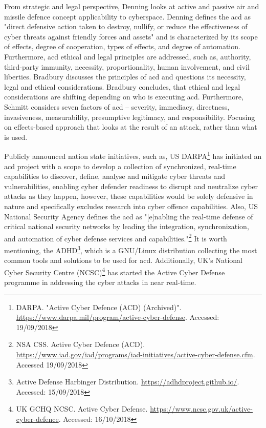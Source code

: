 From strategic and legal perspective, Denning \cite{Denning2014} looks at active and passive air and missile defence concept applicability to cyberspace. Denning defines the \gls{acd} as "direct defensive action taken to destroy, nullify, or reduce the effectiveness of cyber threats against friendly forces and assets" \cite{Denning2014} and is characterized by its scope of effects, degree of cooperation, types of effects, and degree of automation. Furthermore, \gls{acd} ethical and legal principles are addressed, such as, authority, third-party immunity, necessity, proportionality, human involvement, and civil liberties.
Bradbury \cite{Bradbury2013} discusses the principles of \gls{acd} and questions its necessity, legal and ethical considerations. Bradbury concludes, that ethical and legal considerations are shifting depending on who is executing \gls{acd}.
Furthermore, Schmitt \cite{Schmitt2002} considers seven factors of \gls{acd} -- severity, immediacy, directness, invasiveness, measurability, presumptive legitimacy, and responsibility. Focusing on effects-based approach that looks at the result of an attack, rather than what is used.

Publicly announced nation state initiatives, such as, US DARPA\footnote{\label{fnote:darpa}DARPA. "Active Cyber Defence (ACD) (Archived)". \url{https://www.darpa.mil/program/active-cyber-defense}. Accessed: 19/09/2018} has initiated an \gls{acd} project with a scope to develop a collection of synchronized, real-time capabilities to discover, define, analyse and mitigate cyber threats and vulnerabilities, enabling cyber defender readiness to disrupt and neutralize cyber attacks as they happen, however, these capabilities would be solely defensive in nature and specifically excludes research into cyber offence capabilities.
Also, US National Security Agency defines the \gls{acd} as "[e]nabling the real-time defense of critical national security networks by leading the integration, synchronization, and automation of cyber defense services and capabilities."\footnote{\label{fnote:nsa}NSA CSS. Active Cyber Defence (ACD). \url{https://www.iad.gov/iad/programs/iad-initiatives/active-cyber-defense.cfm}. Accessed 19/09/2018}
It is worth mentioning, the ADHD\footnote{\label{fnote:adhd}Active Defense Harbinger Distribution. \url{https://adhdproject.github.io/}. Accessed: 15/09/2018}, which is a GNU/Linux distribution collecting the most common tools and solutions to be used for \gls{acd}.
Additionally, UK's National Cyber Security Centre (NCSC)\footnote{UK GCHQ NCSC. Active Cyber Defense. \url{https://www.ncsc.gov.uk/active-cyber-defence}. Accessed: 16/10/2018} has started the Active Cyber Defense programme in addressing the cyber attacks in near real-time.

